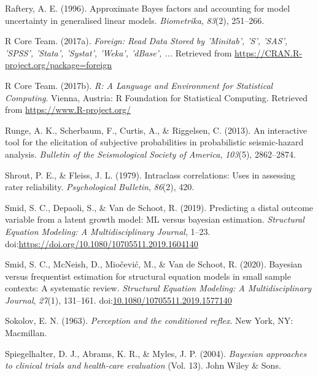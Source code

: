 \documentclass[openright,titlepage,12pt,a4paper]{book}
\begin{document}
\leavevmode\hypertarget{ref-raftery_approximate_1996}{}%
Raftery, A. E. (1996). Approximate Bayes factors and accounting for model uncertainty in generalised linear models. \emph{Biometrika}, \emph{83}(2), 251--266.

\leavevmode\hypertarget{ref-r_core_team_foreign:_2017}{}%
R Core Team. (2017a). \emph{Foreign: Read Data Stored by 'Minitab', 'S', 'SAS', 'SPSS', 'Stata', 'Systat', 'Weka', 'dBase', ...} Retrieved from \url{https://CRAN.R-project.org/package=foreign}

\leavevmode\hypertarget{ref-r_core_team_r:_2017}{}%
R Core Team. (2017b). \emph{R: A Language and Environment for Statistical Computing}. Vienna, Austria: R Foundation for Statistical Computing. Retrieved from \url{https://www.R-project.org/}

\leavevmode\hypertarget{ref-runge_interactive_2013}{}%
Runge, A. K., Scherbaum, F., Curtis, A., \& Riggelsen, C. (2013). An interactive tool for the elicitation of subjective probabilities in probabilistic seismic‐hazard analysis. \emph{Bulletin of the Seismological Society of America}, \emph{103}(5), 2862--2874.

\leavevmode\hypertarget{ref-shrout_intraclass_1979}{}%
Shrout, P. E., \& Fleiss, J. L. (1979). Intraclass correlations: Uses in assessing rater reliability. \emph{Psychological Bulletin}, \emph{86}(2), 420.

\leavevmode\hypertarget{ref-smid_predicting_2019}{}%
Smid, S. C., Depaoli, S., \& Van de Schoot, R. (2019). Predicting a distal outcome variable from a latent growth model: ML versus bayesian estimation. \emph{Structural Equation Modeling: A Multidisciplinary Journal}, 1--23. doi:\href{https://doi.org/https://doi.org/10.1080/10705511.2019.1604140}{https://doi.org/10.1080/10705511.2019.1604140}

\leavevmode\hypertarget{ref-smid_bayesian_2019}{}%
Smid, S. C., McNeish, D., Miočević, M., \& Van de Schoot, R. (2020). Bayesian versus frequentist estimation for structural equation models in small sample contexts: A systematic review. \emph{Structural Equation Modeling: A Multidisciplinary Journal}, \emph{27}(1), 131--161. doi:\href{https://doi.org/10.1080/10705511.2019.1577140}{10.1080/10705511.2019.1577140}

\leavevmode\hypertarget{ref-sokolov_perception_1963}{}%
Sokolov, E. N. (1963). \emph{Perception and the conditioned reflex}. New York, NY: Macmillan.

\leavevmode\hypertarget{ref-spiegelhalter_bayesian_2004}{}%
Spiegelhalter, D. J., Abrams, K. R., \& Myles, J. P. (2004). \emph{Bayesian approaches to clinical trials and health-care evaluation} (Vol. 13). John Wiley \& Sons.
\end{document}
